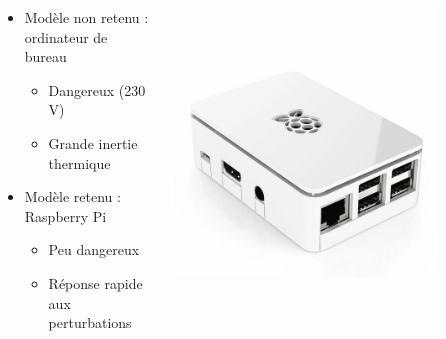\documentclass[a4paper,11pt]{beamer}
\begin{document}
\begin{frame}
    \begin{columns}
        \begin{column}{0.55\textwidth}
            \begin{itemize}
                \item Modèle non retenu : ordinateur de bureau
                \begin{itemize}
                    \item Dangereux (230 V)
                    \item Grande inertie thermique
                \end{itemize}
                \item Modèle retenu : Raspberry Pi
                \begin{itemize}
                    \item Peu dangereux
                    \item Réponse rapide aux perturbations
                \end{itemize}
            \end{itemize}
        \end{column}
        \begin{column}{0.45\textwidth}
            \includegraphics[width=0.8\textwidth]{raspberry_pi.jpg}
        \end{column}
    \end{columns}
\end{frame} %
\end{document}
